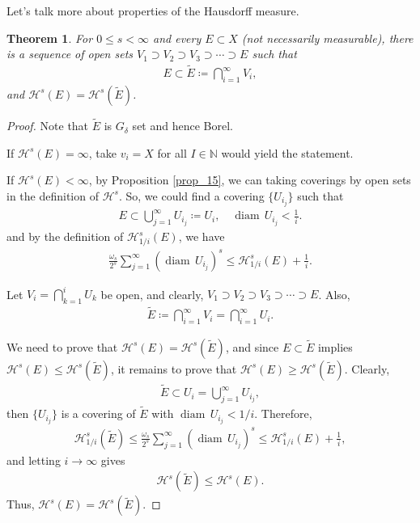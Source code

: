 \documentclass[11pt]{book}
\newtheorem{theorem}{Theorem}[chapter]
\theoremstyle{definition}
\numberwithin{equation}{chapter}
\def\H{{\mathcal H}}
\def\diam{{\operatorname{diam}\,}}
\begin{document}
\medskip

Let's talk more about properties of the Hausdorff measure.

\medskip

\begin{theorem}\label{theorem_121}
For $0 \leq s < \infty$ and every $E \subset X$ (not necessarily measurable), there is a sequence of open sets $V_1 \supset V_2 \supset V_3 \supset \cdots \supset E$ such that 
\begin{align*}
    E \subset \widetilde{E} \coloneqq \bigcap^\infty_{i=1} V_i,
\end{align*}
and $\H^s(E) = \H^s (\widetilde{E})$.
\end{theorem}
\begin{proof}
Note that $\widetilde{E}$ is $G_\delta$ set and hence Borel.

If $\H^s(E) = \infty$, take $v_i = X$ for all $I \in \mathbb{N}$ would yield the statement.

If $\H^s(E) < \infty$, by Proposition \ref{prop_15}, we can taking coverings by open sets in the definition of $\H^s$. So, we could find a covering $\{U_{i_j}\}$ such that
\begin{align*}
    E \subset \bigcup^\infty_{j=1} U_{i_j} \coloneqq U_i, \quad \diam U_{i_j} < \frac{1}{i}.
\end{align*}
and by the definition of $\H^s_{1/i} (E)$, we have
\begin{align*}
    \frac{\omega_s}{2^s} \sum^\infty_{j=1} \left(\diam U_{i_j}\right)^s \leq \H^s_{1/i} (E) + \frac{1}{i}.
\end{align*}

Let $V_i = \bigcap^i_{k=1}U_k$ be open, and clearly, $V_1 \supset V_2 \supset V_3 \supset \cdots \supset E$. Also, 
\begin{align*}
    \widetilde{E} \coloneqq \bigcap^\infty_{i=1} V_i = \bigcap^\infty_{i=1} U_i.
\end{align*}

We need to prove that $\H^s(E) = \H^s (\widetilde{E})$, and since $E \subset \widetilde{E}$ implies $\H^s(E) \leq \H^s(\widetilde{E})$, it remains to prove that $\H^s(E) \geq \H^s(\widetilde{E})$. Clearly,
\begin{align*}
    \widetilde{E} \subset U_i = \bigcup^\infty_{j=1} U_{i_j},
\end{align*}
then $\{U_{i_j}\}$ is a covering of $\widetilde{E}$ with $\diam U_{i_j} < 1/i$. Therefore,
\begin{align*}
    \H^s_{1/i}(\widetilde{E}) \leq \frac{\omega_s}{2^s} \sum^\infty_{j=1} \left(\diam U_{i_j}\right)^s \leq \H^s_{1/i}(E) + \frac{1}{i},
\end{align*}
and letting $i \to \infty$ gives
\begin{align*}
    \H^s(\widetilde{E}) \leq \H^s(E).
\end{align*}
Thus, $\H^s(E) = \H^s (\widetilde{E})$.
\end{proof}
\end{document}
